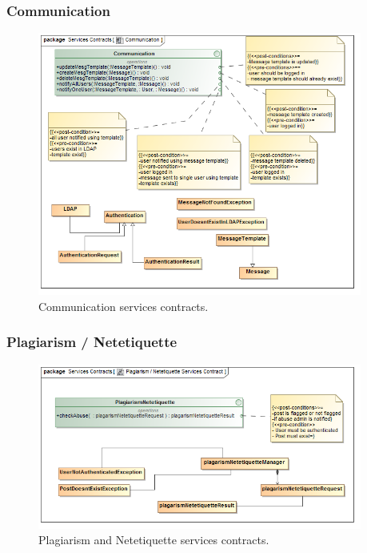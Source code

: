 \documentclass [a4paper,12pt] {article}
\begin{document}
		\subsubsection{Communication}
			\begin{figure}[H]
				\centering
				\includegraphics[width=0.95\textwidth]{CommunicationSC.png}
				\caption{Communication services contracts.}
			\end{figure}
		
		\subsubsection{Plagiarism / Netetiquette}
			\begin{figure}[H]
				\centering
				\includegraphics[width=0.95\textwidth]{PlagiarismNetetiquetteSC.png}
				\caption{Plagiarism and Netetiquette services contracts.}
			\end{figure}
\end{document}
